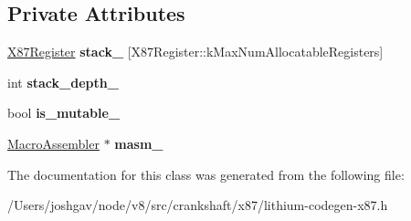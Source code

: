 \subsection*{Private Attributes}
\begin{DoxyCompactItemize}
\item 
\hyperlink{structv8_1_1internal_1_1_double_register}{X87\+Register} {\bfseries stack\+\_\+} \mbox{[}X87\+Register\+::k\+Max\+Num\+Allocatable\+Registers\mbox{]}\hypertarget{classv8_1_1internal_1_1_l_code_gen_1_1_x87_stack_a898d561e6571d0786e1c3c4750e7eebe}{}\label{classv8_1_1internal_1_1_l_code_gen_1_1_x87_stack_a898d561e6571d0786e1c3c4750e7eebe}

\item 
int {\bfseries stack\+\_\+depth\+\_\+}\hypertarget{classv8_1_1internal_1_1_l_code_gen_1_1_x87_stack_aaf90c32755cf9d88cc357d852c4cc759}{}\label{classv8_1_1internal_1_1_l_code_gen_1_1_x87_stack_aaf90c32755cf9d88cc357d852c4cc759}

\item 
bool {\bfseries is\+\_\+mutable\+\_\+}\hypertarget{classv8_1_1internal_1_1_l_code_gen_1_1_x87_stack_a92daf5d04525d34fbfb6c7aee20c6ce4}{}\label{classv8_1_1internal_1_1_l_code_gen_1_1_x87_stack_a92daf5d04525d34fbfb6c7aee20c6ce4}

\item 
\hyperlink{classv8_1_1internal_1_1_macro_assembler}{Macro\+Assembler} $\ast$ {\bfseries masm\+\_\+}\hypertarget{classv8_1_1internal_1_1_l_code_gen_1_1_x87_stack_ab078b2374a10fd47ad7fc52f8058da89}{}\label{classv8_1_1internal_1_1_l_code_gen_1_1_x87_stack_ab078b2374a10fd47ad7fc52f8058da89}

\end{DoxyCompactItemize}


The documentation for this class was generated from the following file\+:\begin{DoxyCompactItemize}
\item 
/\+Users/joshgav/node/v8/src/crankshaft/x87/lithium-\/codegen-\/x87.\+h\end{DoxyCompactItemize}
